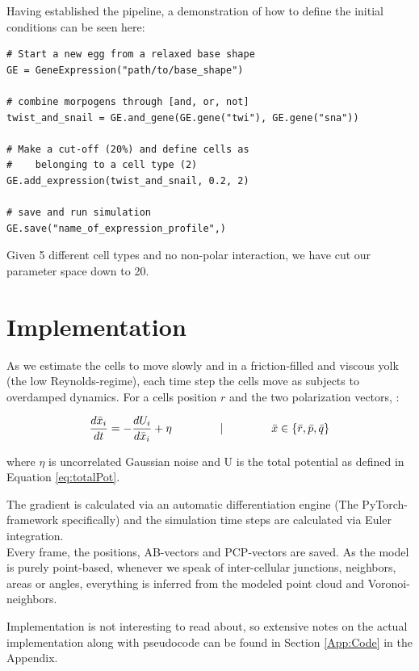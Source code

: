 Having established the pipeline, a demonstration of how to define the initial conditions can be seen here:

\begin{lstlisting}
# Start a new egg from a relaxed base shape
GE = GeneExpression("path/to/base_shape")

# combine morpogens through [and, or, not]
twist_and_snail = GE.and_gene(GE.gene("twi"), GE.gene("sna"))

# Make a cut-off (20%) and define cells as 
#    belonging to a cell type (2) 
GE.add_expression(twist_and_snail, 0.2, 2) 

# save and run simulation
GE.save("name_of_expression_profile",)

\end{lstlisting}

Given 5 different cell types and no non-polar interaction, we have cut our parameter space down to 20.



\section{Implementation}
As we estimate the cells to move slowly and in a friction-filled and viscous yolk (the low Reynolds-regime), each time step the cells move as subjects to overdamped dynamics. For a cells position $r$ and the two polarization vectors, :

\begin{equation}
    \frac{d \bar{x}_i}{d t}=-\frac{d U_i}{d \bar{x}_i}+\eta \hspace{1.5cm}|\hspace{1.5cm}  \bar{x} \in \{\bar{r}, \bar{p}, \bar{q}\}
\end{equation}

where $\eta$ is uncorrelated Gaussian noise and U is the total potential as defined in Equation \ref{eq:totalPot}.

The gradient is calculated via an automatic differentiation engine (The PyTorch-framework specifically) and the simulation time steps are calculated via Euler integration.\\

Every frame, the positions, AB-vectors and PCP-vectors are saved. As the model is purely point-based, whenever we speak of inter-cellular junctions, neighbors, areas or angles, everything is inferred from the modeled point cloud and Voronoi-neighbors. 

Implementation is not interesting to read about, so extensive notes on the actual implementation along with pseudocode can be found in Section \ref{App:Code} in the Appendix.

